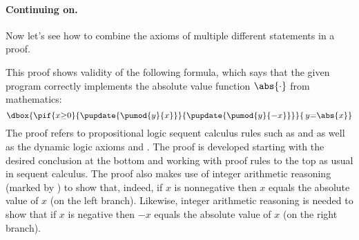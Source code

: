\documentclass[11pt,twoside]{scrartcl}
\begin{document}
\paragraph{Continuing on.} 
Now let's see how to combine the axioms of multiple different statements in a proof.
\begin{sequentdeduction}[array]
{\lsequent{} {}}
\end{sequentdeduction}

This proof shows validity of the following formula, which says that the given program correctly implements the absolute value function \(\abs{\cdot}\) from mathematics:
\[{\dbox{\pif{x{\geq}0}{\pupdate{\pumod{y}{x}}}{\pupdate{\pumod{y}{-x}}}}{\,y{=}\abs{x}}}\]
The proof refers to propositional logic sequent calculus rules such as  and  as well as the dynamic logic axioms  and .
The proof is developed starting with the desired conclusion at the bottom and working with proof rules to the top as usual in sequent calculus.
The proof also makes use of integer arithmetic reasoning (marked by ) to show that, indeed, if $x$ is nonnegative then $x$ equals the absolute value of $x$ (on the left branch).
Likewise, integer arithmetic reasoning is needed to show that if $x$ is negative then $-x$ equals the absolute value of $x$ (on the right branch).
\end{document}
